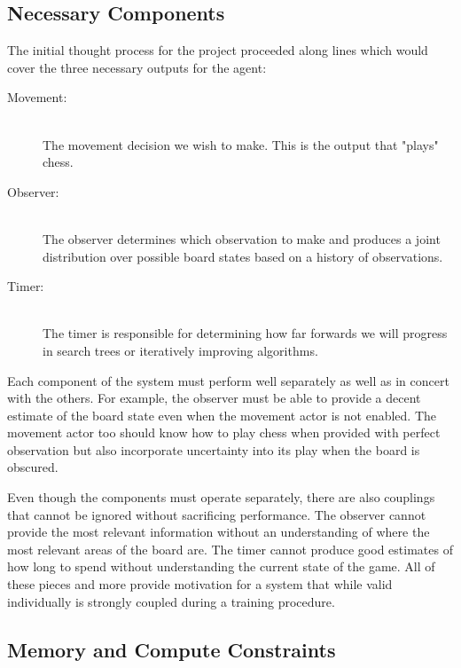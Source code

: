 \documentclass{IEEEtran}
\begin{document}
\subsection{Necessary Components}
The initial thought process for the project proceeded along lines which would
cover the three necessary outputs for the agent:
\begin{description}
    \item[Movement:] \hfill \\
        The movement decision we wish to make. This is the
        output that "plays" chess.
    \item[Observer:] \hfill \\
        The observer determines which observation to make and produces a joint
        distribution over possible board states based on a history of
        observations.
    \item[Timer:] \hfill \\
        The timer is responsible for determining how far forwards we will
        progress in search trees or iteratively improving algorithms.
\end{description}

Each component of the system must perform well separately as well as in concert
with the others. For example, the observer must be able to provide a decent
estimate of the board state even when the movement actor is not enabled. The
movement actor too should know how to play chess when provided with perfect
observation but also incorporate uncertainty into its play when the board is
obscured.

Even though the components must operate separately, there are also couplings
that cannot be ignored without sacrificing performance. The observer cannot
provide the most relevant information without an understanding of where the most
relevant areas of the board are. The timer cannot produce good estimates of how
long to spend without understanding the current state of the game. All of these
pieces and more provide motivation for a system that while valid individually is
strongly coupled during a training procedure.

\subsection{Memory and Compute Constraints}
\end{document}
